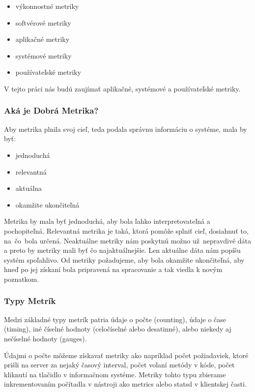 \documentclass[a4paper, usesections, upjsfrontpage, thesismargins, thesislinespacing, twoside]{rnthesissvk}
\begin{document}
\begin{itemize}
	\item výkonnostné metriky
	\item softvérové metriky
	\item aplikačné metriky
	\item systémové metriky
	\item používateľské metriky
\end{itemize}

V tejto práci nás budú zaujímať aplikačné, systémové a používateľské metriky.

\subsubsection{Aká je Dobrá Metrika?}

Aby metrika plnila svoj cieľ, teda podala správnu informáciu o systéme, mala by byť:
\begin{itemize}
	\item jednoduchá
	\item relevantná
	\item aktuálna
	\item okamžite ukončiteľná
\end{itemize}

Metrika by mala byť jednoduchá, aby bola ľahko interpretovateľná a pochopiteľná.
Relevantná metrika je taká, ktorá pomôže splniť cieľ, dosiahnuť to, na~čo~bola určená.
Neaktuálne metriky nám poskytnú možno už~nep\-ravdivé dáta a preto by metriky mali byť čo najaktuálnejšie. 
Len aktuálne dáta nám popíšu systém spoľahlivo.
Od metriky požadujeme, aby bola okamžite ukončiteľná, aby hneď po jej získaní bola pripravená na spracovanie a tak viedla k novým poznatkom.

\subsubsection{Typy Metrík}

Medzi základné typy metrík patria údaje o počte (counting), údaje o čase (timing), iné číselné hodnoty (celočíselné alebo desatinné), alebo niekedy aj nečíselné hodnoty (gauges). 

Údajmi o počte môžeme získavať metriky ako napríklad počet požiadaviek, ktoré prišli na server za nejaký časový interval, počet volaní metódy v kóde, počet kliknutí na tlačidlo v informačnom systéme. Metriky tohto typu zbierame inkrementovaním počítadla v nástroji ako metrics alebo statsd v klientskej časti.
\end{document}

